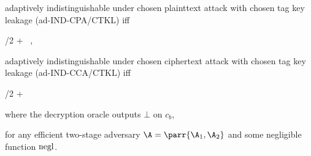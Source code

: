 \begin{definition}
\begin{sitemize}
        \item adaptively indistinguishable under chosen plainttext attack with chosen tag key leakage (ad-IND-CPA/CTKL) iff
        \begin{bralign}
            /2 + \varepsilon\parr{\secpar}
            \ ,
        \end{bralign}

        \item adaptively indistinguishable under chosen ciphertext attack with chosen tag key leakage (ad-IND-CCA/CTKL) iff
        \begin{bralign}
            /2 + \varepsilon\parr{\secpar}
        \end{bralign}
        where the decryption oracle outputs \(\bot\) on \(c_b\),
    \end{sitemize}
    for any efficient two-stage adversary \(\A = \parr{\A_1, \A_2}\) and some negligible function \(\operatorname{negl}\).
\end{definition}

